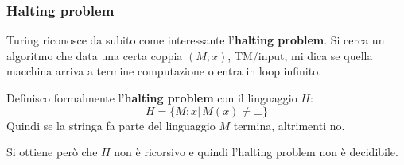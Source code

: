 \subsubsection{Halting problem}
Turing riconosce da subito come interessante l'\textbf{halting problem}. Si
cerca un algoritmo che data una certa coppia $(M;x)$, TM/input, mi dica se
quella macchina arriva a termine computazione o entra in loop infinito.
\begin{definizione}
  Definisco formalmente l'\textbf{halting problem} con il linguaggio $H$:
  \[H=\{M;x|\,M(x)\neq\bot\}\]
  Quindi se la stringa fa parte del linguaggio $M$ termina, altrimenti no.
\end{definizione}
\begin{definizione}
  Si ottiene però che $H$ non è ricorsivo e quindi l'halting problem non è
  decidibile.
\end{definizione}

